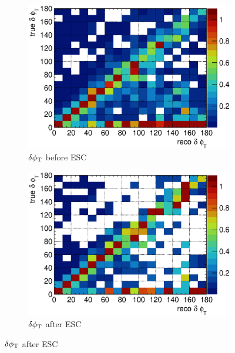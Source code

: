 \begin{figure}
          \\
          \begin{subfigure}[b]{\dbfigwid\textwidth}
               \centering
               \includegraphics[width=\textwidth]{figures/perf/tki/dphitcolnor_resmat_al10_sfgmu.eps}
               \caption{$\delta\phi_\textrm{T}$ before ESC}
               \label{subfig:esc-dphit-bfesc-sfgmu}
          \end{subfigure}
          \begin{subfigure}[b]{\dbfigwid\textwidth}
               \centering
               \includegraphics[width=\textwidth]{figures/perf/tki/dphitcolnor_resmat_al11_sfgmu.eps}
               \caption{$\delta\phi_\textrm{T}$ after ESC}
               \label{subfig:esc-dphit-afesc-sfgmu}
          \end{subfigure}

\end{figure}
